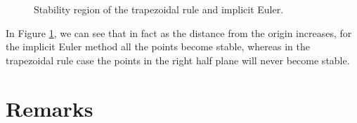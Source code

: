 \documentclass[journal,onecolumn]{IEEEtran}
\begin{document}


%
%

\begin{figure}[!ht]
	\centering
	\hfil
	\caption{Stability region of the trapezoidal rule and implicit Euler.}
	\label{fig:stability}
\end{figure}

In Figure \ref{fig:stability}, we can see that in fact as the distance from the origin increases, for the implicit Euler method all the points become stable, whereas in the trapezoidal rule case the points in the right half plane will never become stable.

\section* {Remarks}
\end{document}
